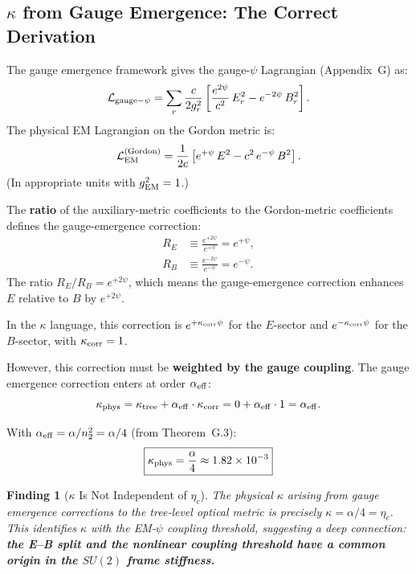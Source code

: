 \documentclass[11pt,a4paper]{article}
\newtheorem{finding}{Finding}
\theoremstyle{definition}
\theoremstyle{remark}
\begin{document}
\subsection{$\kappa$ from Gauge Emergence: The Correct Derivation}

The gauge emergence framework gives the gauge-$\psi$ Lagrangian
(Appendix~G) as:
\begin{equation}
\mathcal{L}_{\rm gauge-\psi} = \sum_r
\frac{c}{2g_r^2}\left[\frac{e^{2\psi}}{c^2}\,E_r^2 - e^{-2\psi}\,B_r^2\right].
\end{equation}
The physical EM Lagrangian on the Gordon metric is:
\begin{equation}
\mathcal{L}_{\rm EM}^{\rm (Gordon)} = \frac{1}{2c}
\left[e^{+\psi}\,E^2 - c^2\,e^{-\psi}\,B^2\right].
\end{equation}
(In appropriate units with $g_{\rm EM}^2 = 1$.)

The \textbf{ratio} of the auxiliary-metric coefficients to the
Gordon-metric coefficients defines the gauge-emergence correction:
\begin{align}
R_E &\equiv \frac{e^{+2\psi}}{e^{+\psi}} = e^{+\psi}, \\[4pt]
R_B &\equiv \frac{e^{-2\psi}}{e^{-\psi}} = e^{-\psi}.
\end{align}
The ratio $R_E/R_B = e^{+2\psi}$, which means the gauge-emergence
correction enhances $E$ relative to $B$ by $e^{+2\psi}$.

In the $\kappa$ language, this correction is
$e^{+\kappa_{\rm corr}\psi}$ for the $E$-sector and
$e^{-\kappa_{\rm corr}\psi}$ for the $B$-sector, with
$\kappa_{\rm corr} = 1$.

However, this correction must be \textbf{weighted by the gauge
coupling}.  The gauge emergence correction enters at order
$\alpha_{\rm eff}$:
\begin{equation}
\kappa_{\rm phys} = \kappa_{\rm tree} + \alpha_{\rm eff}\cdot\kappa_{\rm corr}
= 0 + \alpha_{\rm eff}\cdot 1 = \alpha_{\rm eff}.
\end{equation}

With $\alpha_{\rm eff} = \alpha/n_2^2 = \alpha/4$ (from Theorem~G.3):
\begin{equation}
\boxed{\kappa_{\rm phys} = \frac{\alpha}{4} \approx 1.82 \times 10^{-3}}
\end{equation}

\begin{finding}[$\kappa$ Is Not Independent of $\eta_c$]
The physical $\kappa$ arising from gauge emergence corrections to the
tree-level optical metric is precisely $\kappa = \alpha/4 = \eta_c$.
This identifies $\kappa$ with the EM-$\psi$ coupling threshold,
suggesting a deep connection: \textbf{the E--B split and the
nonlinear coupling threshold have a common origin in the $SU(2)$
frame stiffness.}
\end{finding}
\end{document}
